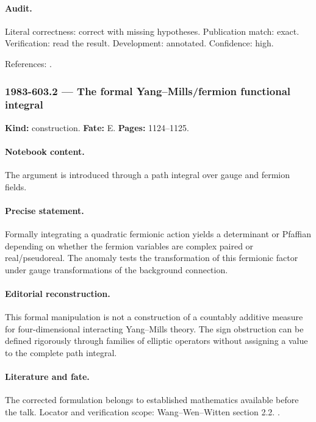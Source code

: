 \paragraph{Audit.} Literal correctness: correct with missing hypotheses. Publication match: exact. Verification: read the result. Development: annotated. Confidence: high.

\noindent References: \citep{witten1982anomaly,wangwenwitten2019new}.\par

\subsubsection{1983-603.2 --- The formal Yang--Mills/fermion functional integral}

\label{item:1983-603.2}

\noindent\textbf{Kind:} construction. \textbf{Fate:} E. \textbf{Pages:} 1124--1125.\par

\paragraph{Notebook content.} The argument is introduced through a path integral over gauge and fermion fields.

\paragraph{Precise statement.} Formally integrating a quadratic fermionic action yields a determinant or Pfaffian depending on whether the fermion variables are complex paired or real/pseudoreal. The anomaly tests the transformation of this fermionic factor under gauge transformations of the background connection.

\paragraph{Editorial reconstruction.} This formal manipulation is not a construction of a countably additive measure for four-dimensional interacting Yang--Mills theory. The sign obstruction can be defined rigorously through families of elliptic operators without assigning a value to the complete path integral.

\paragraph{Literature and fate.} The corrected formulation belongs to established mathematics available before the talk. Locator and verification scope: Wang--Wen--Witten section 2.2. \cite{witten1982anomaly,wangwenwitten2019new}.

